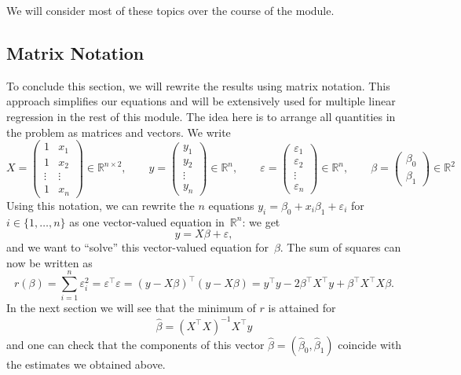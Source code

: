 \documentclass[
  a4paper,
]{article}
\theoremstyle{definition}
\theoremstyle{definition}
\theoremstyle{definition}
\theoremstyle{definition}
\theoremstyle{remark}
\begin{document}
We will consider most of these topics over the course of the
module.

\subsection{Matrix Notation}\label{sec:simple-mat}

To conclude this section, we will rewrite the results using matrix notation.
This approach simplifies our equations and will be extensively used for
multiple linear regression in the rest of this module. The idea here is to
arrange all quantities in the problem as matrices and vectors. We write
\begin{equation*}
  X = \begin{pmatrix}
    1 & x_1\\ 1 & x_2\\\vdots & \vdots\\1 & x_n
  \end{pmatrix}
  \in \mathbb{R}^{n\times 2},
  \qquad
  y = \begin{pmatrix}
    y_1 \\ y_2 \\ \vdots \\ y_n
  \end{pmatrix}
  \in \mathbb{R}^n,
  \qquad
  \varepsilon= \begin{pmatrix}
    \varepsilon_1 \\ \varepsilon_2 \\ \vdots \\ \varepsilon_n
  \end{pmatrix}
  \in \mathbb{R}^n,
  \qquad
  \beta = \begin{pmatrix}
    \beta_0 \\
    \beta_1
  \end{pmatrix}
  \in\mathbb{R}^2
\end{equation*}
Using this notation, we can rewrite the \(n\) equations \(y_i = \beta_0 +
x_i \beta_1 + \varepsilon_i\) for \(i \in \{1, \ldots, n\}\) as one
vector-valued equation in~\(\mathbb{R}^n\): we get
\begin{equation*}
  y = X\beta + \varepsilon,
\end{equation*}
and we want to ``solve'' this vector-valued equation for~\(\beta\).
The sum of squares can now be written as
\begin{equation*}
  r(\beta)
  = \sum_{i=1}^n \varepsilon_i^2
  = \varepsilon^\top \varepsilon
  = (y - X\beta)^\top (y - X\beta)
  = y^\top y - 2\beta^\top X^\top y + \beta^\top X^\top X \beta.
\end{equation*}
In the next section we will see that the minimum of \(r\) is attained
for
\begin{equation*}
  \hat\beta
  = (X^\top X)^{-1} X^\top y
\end{equation*}
and one can check that the components of this vector \(\hat\beta = (\hat\beta_0,
\hat\beta_1)\) coincide with the estimates we obtained above.
\end{document}
